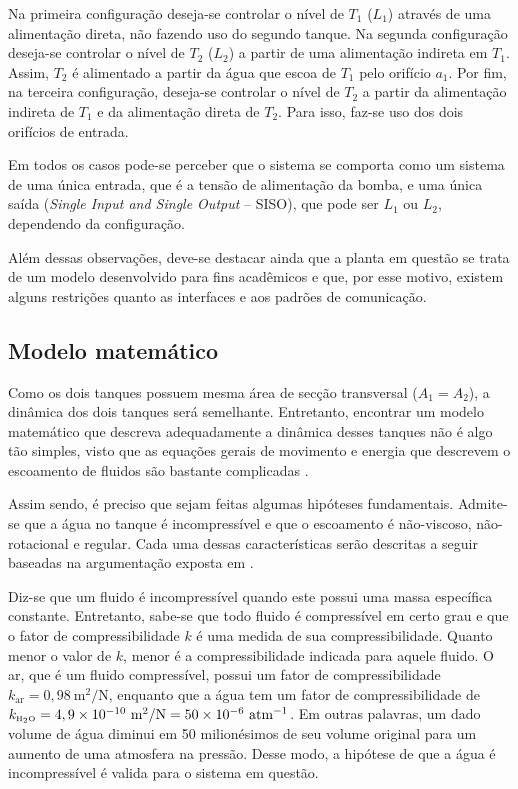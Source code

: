 Na primeira configuração deseja-se controlar o nível de $T_1$ ($L_1$) através de
uma alimentação direta, não fazendo uso do segundo tanque. Na segunda
configuração deseja-se controlar o nível de $T_2$ ($L_2$) a partir de uma
alimentação indireta em $T_1$. Assim, $T_2$ é alimentado a partir da água que
escoa de $T_1$ pelo orifício $a_1$. Por fim, na terceira configuração, deseja-se
controlar o nível de $T_2$ a partir da alimentação indireta de $T_1$ e da
alimentação direta de $T_2$. Para isso, faz-se uso dos dois orifícios de
entrada.


Em todos os casos pode-se perceber que o sistema se comporta como um sistema de
uma única entrada, que é a tensão de alimentação da bomba, e uma única saída
({\it Single Input and Single Output} -- SISO), que pode ser $L_1$ ou $L_2$,
dependendo da configuração.


Além dessas observações, deve-se destacar ainda que a planta em questão se trata
de um modelo desenvolvido para fins acadêmicos e que, por esse motivo, existem
alguns restrições quanto as interfaces e aos padrões de comunicação.

\subsection{Modelo matemático}

Como os dois tanques possuem mesma área de secção transversal ($A_1 = A_2$), a
dinâmica dos dois tanques será semelhante. Entretanto, encontrar um modelo
matemático que descreva adequadamente a dinâmica desses tanques não é algo tão
simples, visto que as equações gerais de movimento e energia que descrevem o
escoamento de fluidos são bastante complicadas \cite{dorf:2009}.

Assim sendo, é preciso que sejam feitas algumas hipóteses fundamentais.
Admite-se que a água no tanque é incompressível e que o escoamento é
não-viscoso, não-rotacional e regular. Cada uma dessas características serão
descritas a seguir baseadas na argumentação exposta em .

Diz-se que um fluido é incompressível quando este possui uma massa específica
constante. Entretanto, sabe-se que todo fluido é compressível em certo grau e
que o fator de compressibilidade $k$ é uma medida de sua compressibilidade.
Quanto menor o valor de $k$, menor é a compressibilidade indicada para aquele
fluido. O ar, que é um fluido compressível, possui um fator de compressibilidade
$k_{\text{ar}} = 0,98\ \text{m}^2/\text{N}$, enquanto que a água tem um fator de
compressibilidade de $k_{\tiny \text{\tiny H}_2\text{\tiny O}} = 4,9 \times
10^{-10}\ \text{m}^2/\text{N} = 50 \times 10^{-6}\ \text{atm}^{-1}$. Em outras
palavras, um dado volume de água diminui em 50 milionésimos de seu volume
original para um aumento de uma atmosfera na pressão. Desse modo, a hipótese de
que a água é incompressível é valida para o sistema em questão.

